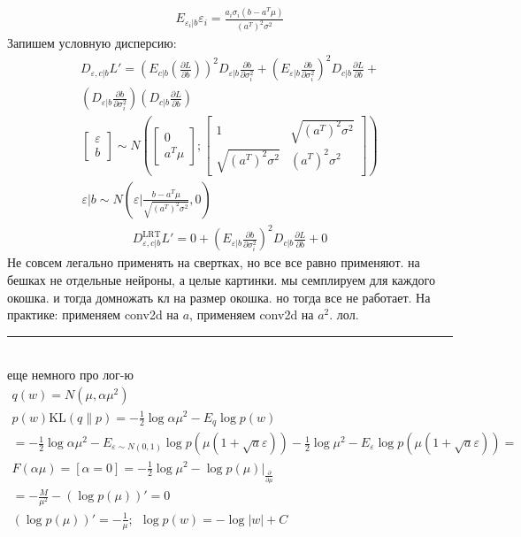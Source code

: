 \documentclass{minimal}
\begin{document}
\begin{gather*}
  E_{\varepsilon_i|b}\varepsilon_i=\frac{a_i\sigma_i(b-a^T\mu)}{(a^T)^2\sigma^2}
\end{gather*}
Запишем условную дисперсию:
\begin{gather*}
  D_{\varepsilon,c|b}L'=\left(E_{c|b} \left(\frac{\partial L}{\partial b}\right)\right)^2 D_{\varepsilon|b} \frac{\partial b}{\partial \sigma_i^2}+
  \left(E_{\varepsilon|b}\frac{\partial b}{\partial \sigma_i^2}\right)^2
  D_{c|b}\frac{\partial L}{\partial b}+\\
  \left(D_{\varepsilon|b}\frac{\partial b}{\partial \sigma_i^2}\right)
  \left(D_{c|b}\frac{\partial L}{\partial b}\right)
\end{gather*}
\begin{gather*}
  \begin{bmatrix}
    \varepsilon\\b
  \end{bmatrix}\sim N\left(
  \begin{bmatrix}
    0\\a^T\mu
  \end{bmatrix};
  \begin{bmatrix}
    1&\sqrt{(a^T)^2\sigma^2}\\
    \sqrt{(a^T)^2\sigma^2}&(a^T)^2\sigma^2
  \end{bmatrix}\right)\\
  \varepsilon|b\sim N\left(\varepsilon\bigg|\frac{b-a^T\mu}{\sqrt{(a^T)^2\sigma^2}}, 0\right)
\end{gather*}
\begin{gather*}
  D^{\mathrm{LRT}}_{\varepsilon,c|b}L'=
  0+\left(E_{\varepsilon|b}\frac{\partial b}{\partial \sigma_i^2}\right)^2
  D_{c|b}\frac{\partial L}{\partial b} + 0
\end{gather*}
Не совсем легально применять на свертках, но все все равно применяют. на бешках не отдельные нейроны, а целые картинки. мы семплируем для каждого окошка. и тогда домножать кл на размер окошка. но тогда все не работает. На практике: применяем conv2d на $a$, применяем conv2d на $a^2$. лол.
\\
\hrule
~\\еще немного про лог-ю
\begin{gather*}
  q(w)=N(\mu,\alpha\mu^2)\\
  p(w)
  \mathrm{KL}(q\|p)=-\frac{1}{2}\log \alpha\mu^2 -E_q \log p(w)\\
  =-\frac{1}{2}\log \alpha\mu^2-E_{\varepsilon \sim N(0, 1)}\log p(\mu(1+\sqrt{a}\varepsilon))-\frac{1}{2}\log \mu^2-
  E_{\varepsilon}\log p(\mu(1+\sqrt{a}\varepsilon))=\\
F(\alpha\mu)=[\alpha=0]= -\frac{1}{2}\log \mu^2-\log p(\mu) \bigg\rvert_{\frac{\partial }{\partial \mu}}\\
=-\frac{M}{\mu^2}-(\log p(\mu))'=0\\
(\log p(\mu))'=-\frac{1}{\mu};~~\log p(w)=-\log|w|+C
\end{gather*}
\end{document}
